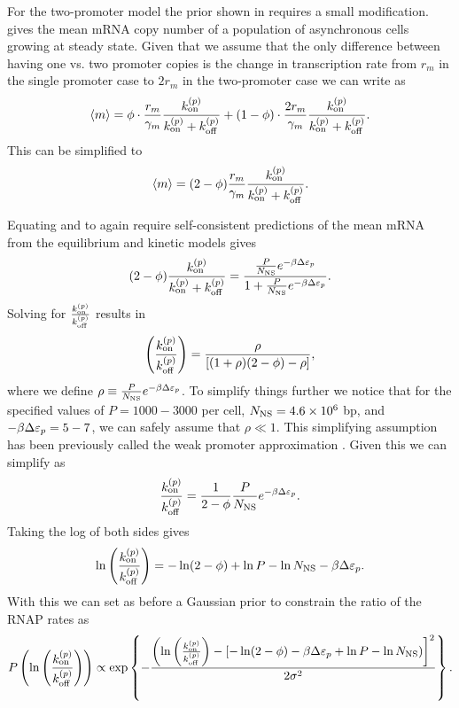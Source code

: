 For the two-promoter model the prior shown in  requires a
small modification.  gives the mean mRNA copy number of a
population of asynchronous cells growing at steady state. Given that we assume
that the only difference between having one vs. two promoter copies is the
change in transcription rate from $r_m$ in the single promoter case to $2 r_m$
in the two-promoter case we can
write  as
\begin{equation}
  \left\langle m \right\rangle = \phi \cdot {r_m \over \gamma _m} {k^{(p)}_{\text{on}}\over k^{(p)}_{\text{on}}+ k^{(p)}_{\text{off}}} +
      (1 -\phi) \cdot {2 r_m \over \gamma _m} {k^{(p)}_{\text{on}}\over k^{(p)}_{\text{on}}+ k^{(p)}_{\text{off}}}.
\end{equation}
This can be simplified to
\begin{equation}
  \left\langle m \right\rangle = (2 - \phi) {r_m \over \gamma _m} {k^{(p)}_{\text{on}} \over k^{(p)}_{\text{on}} + k^{(p)}_{\text{off}}}.
  \label{seq_mean_m_double_rates}
\end{equation}

Equating  and  to again
require self-consistent predictions of the mean mRNA from the equilibrium and
kinetic models gives
\begin{equation}
  (2 - \phi) {k^{(p)}_{\text{on}} \over k^{(p)}_{\text{on}} + k^{(p)}_{\text{off}}} =
  {{P \over N_\text{NS}} e^{-\beta\Delta\varepsilon_p}
  \over 1 + {P \over N_\text{NS}} e^{-\beta\Delta\varepsilon_p}}.
\end{equation}
Solving for $k^{(p)}_{\text{on}} \over k^{(p)}_{\text{off}}$ results in
\begin{equation}
  \left({k^{(p)}_{\text{on}} \over k^{(p)}_{\text{off}}}\right) =
  {\rho \over \left[ (1 + \rho)(2 - \phi) - \rho \right]},
  \label{seq_kinetic_thermo_equiv}
\end{equation}
where we define $\rho \equiv {P \over N_\text{NS}} e^{-\beta\Delta\varepsilon_p}$. To simplify things
further we notice that for the specified values of $P = 1000 - 3000$ per cell,
$N_\text{NS} = 4.6 \times 10^6$ bp, and $-\beta\Delta\varepsilon_p = 5 - 7$, we can safely assume that
$\rho \ll 1$. This simplifying assumption has been previously called the weak
promoter approximation \cite{Garcia2011c}. Given this we can simplify
 as
\begin{equation}
  {k^{(p)}_{\text{on}}\over k^{(p)}_{\text{off}}} = {1 \over 2 - \phi} {P \over N_\text{NS}} e^{-\beta\Delta\varepsilon_p}.
\end{equation}
Taking the log of both sides gives
\begin{equation}
  \ln\left({k^{(p)}_{\text{on}} \over k^{(p)}_{\text{off}}}\right) = -\ln (2 - \phi) + \ln P - \ln N_\text{NS}
  - \beta\Delta\varepsilon_p.
\end{equation}
With this we can set as before a Gaussian prior to constrain the ratio of the
RNAP rates as
\begin{equation}
  P\left(\ln \left({k^{(p)}_{\text{on}} \over k^{(p)}_{\text{off}}}\right) \right)  \propto
  \exp \left\{ - {\left(\ln \left({k^{(p)}_{\text{on}} \over k^{(p)}_{\text{off}}}\right) -
  \left[-\ln(2 - \phi) -\beta\Delta\varepsilon_p + \ln P - \ln N_\text{NS} \right) \right]^2
  \over 2 \sigma^2} \right\}.
  \label{seq_prior_double}
\end{equation}

